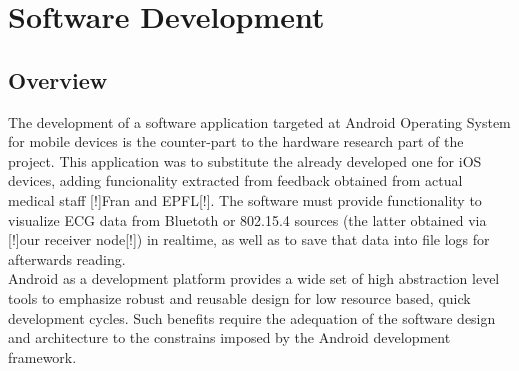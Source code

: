 \chapter{Software Development} %


	\section{Overview}

	\begin{comment}
		Microestado del arte:
		Desarrollo para dispositivos android, paradigma particular, no estamos formados en él (y esto ha dado problemas), 
arquitecturas muy particulares, en el momento de comenzar el desarrollo documentación buena pero muy técnica, más para consulta que para formación. Versiones de android para usb host, … => impone requisitos al dispositivo tablet
    (Posibilidad de hilos destruidos en cada momento, atender al giro de pantalla, destrucción de la actividad, …)
    Limitaciones de android como plataforma (java vm, opengl, …)
    Aplicación iphone: funcionalidad limitada, captura de requisitos comenzó por ella, crear un producto a partir del prototipo.
    Se añadió feedback de los médicos con que trabaja Fran en Murcia (Preguntar a Recas) (en particular los logs!)

	\end{comment}

	The development of a software application targeted at Android Operating System for mobile devices is the counter-part to the hardware research part of the project.
	This application was to substitute the already developed one for iOS devices, adding funcionality extracted from feedback obtained from actual medical staff [!]Fran and EPFL[!]. The software must provide functionality to visualize ECG data from Bluetoth or 802.15.4 sources (the latter obtained via [!]our receiver node[!]) in realtime, as well as to save that data into file logs for afterwards reading.\\

	Android as a development platform provides a wide set of high abstraction level tools to emphasize robust and reusable design for low resource based, quick development cycles. Such benefits require the adequation of the software design and architecture to the constrains imposed by the Android development framework.\\


